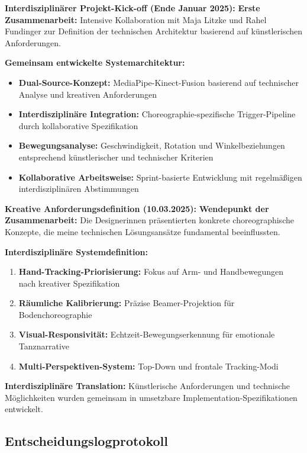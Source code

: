 \textbf{Interdisziplinärer Projekt-Kick-off (Ende Januar 2025):}
\textbf{Erste Zusammenarbeit:} Intensive Kollaboration mit Maja Litzke und Rahel Fundinger zur Definition der technischen Architektur basierend auf künstlerischen Anforderungen.

\textbf{Gemeinsam entwickelte Systemarchitektur:}
\begin{itemize}
    \item \textbf{Dual-Source-Konzept:} MediaPipe-Kinect-Fusion basierend auf technischer Analyse und kreativen Anforderungen
    \item \textbf{Interdisziplinäre Integration:} Choreographie-spezifische Trigger-Pipeline durch kollaborative Spezifikation
    \item \textbf{Bewegungsanalyse:} Geschwindigkeit, Rotation und Winkelbeziehungen entsprechend künstlerischer und technischer Kriterien
    \item \textbf{Kollaborative Arbeitsweise:} Sprint-basierte Entwicklung mit regelmäßigen interdisziplinären Abstimmungen
\end{itemize}

\textbf{Kreative Anforderungsdefinition (10.03.2025):}
\textbf{Wendepunkt der Zusammenarbeit:} Die Designerinnen präsentierten konkrete choreographische Konzepte, die meine technischen Lösungsansätze fundamental beeinflussten.

\textbf{Interdisziplinäre Systemdefinition:}
\begin{enumerate}
    \item \textbf{Hand-Tracking-Priorisierung:} Fokus auf Arm- und Handbewegungen nach kreativer Spezifikation
    \item \textbf{Räumliche Kalibrierung:} Präzise Beamer-Projektion für Bodenchoreographie
    \item \textbf{Visual-Responsivität:} Echtzeit-Bewegungserkennung für emotionale Tanznarrative  
    \item \textbf{Multi-Perspektiven-System:} Top-Down und frontale Tracking-Modi
\end{enumerate}

\textbf{Interdisziplinäre Translation:} Künstlerische Anforderungen und technische Möglichkeiten wurden gemeinsam in umsetzbare Implementation-Spezifikationen entwickelt.

\subsection{Entscheidungslogprotokoll}

